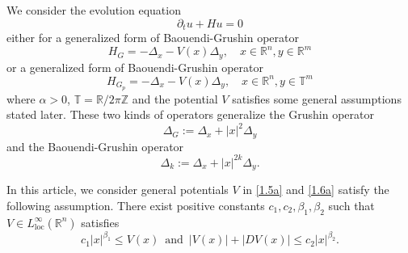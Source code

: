 \documentclass{article}
\numberwithin{equation}{section}
\newcommand\R{\ensuremath{\mathbb{R}}}
\newcommand\Z{\ensuremath{\mathbb{Z}}}
\newcommand\T{\ensuremath{\mathbb{T}}}
\numberwithin{equation}{section}
\newenvironment{taggedtheorem}[1]
 {\renewcommand\thetaggedtheoremx{#1}\taggedtheoremx}
 {\endtaggedtheoremx}
\theoremstyle{definition}
\begin{document}
We consider the evolution equation
\begin{equation}
	\partial_t u + Hu=0\label{1.5b}
\end{equation}
either for a generalized form of Baouendi-Grushin operator 
\begin{equation}\label{1.5a}
	H_{G}=-\Delta_x-V(x)\Delta_y,\quad x \in \R^{n}, y\in \R^{m}
\end{equation}
or a generalized form of Baouendi-Grushin operator
\begin{equation}\label{1.6a}
	H_{G_p}=-\Delta_x-V(x)\Delta_y,\quad  x \in \R^{n},y \in \T^{m}
\end{equation}
where $\alpha >0$, $\T=\R /2 \pi\Z$ and the potential $V$ satisfies some general assumptions stated later. These two kinds of operators generalize the Grushin operator
\begin{equation*}
	\Delta_G:=\Delta_x+|x|^{2}\Delta_y
\end{equation*}
and the Baouendi-Grushin operator
\begin{equation*}
	\Delta_k:=\Delta_x+|x|^{2k}\Delta_y.
\end{equation*}


In this article, we consider general potentials $V$ in \eqref{1.5a} and \eqref{1.6a} satisfy the following assumption.
\begin{taggedtheorem}{A1}\label{A1}
	There exist positive constants $c_1,c_2,\beta_1,\beta_2$ such that $V\in L^{\infty}_{\mathrm{loc}}(\R^{n})$ satisfies
	\begin{equation}
		c_1|x|^{\beta_1}\le V(x) \,\text{ and } \,|V(x)|+|DV(x)|\le c_2|x|^{\beta_2}.
	\end{equation}
\end{taggedtheorem}
\end{document}
